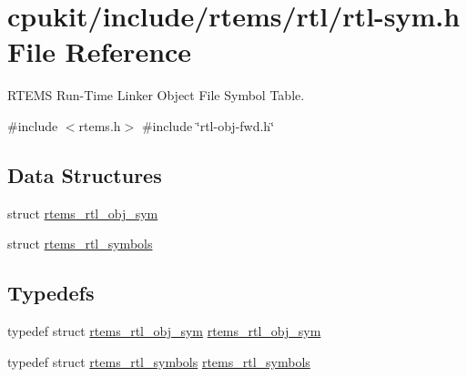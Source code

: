 \hypertarget{rtl-sym_8h}{}\section{cpukit/include/rtems/rtl/rtl-\/sym.h File Reference}
\label{rtl-sym_8h}


R\+T\+E\+MS Run-\/\+Time Linker Object File Symbol Table.  


{\ttfamily \#include $<$rtems.\+h$>$}\newline
{\ttfamily \#include \char`\"{}rtl-\/obj-\/fwd.\+h\char`\"{}}\newline
\subsection*{Data Structures}
\begin{DoxyCompactItemize}
\item 
struct \mbox{\hyperlink{structrtems__rtl__obj__sym}{rtems\+\_\+rtl\+\_\+obj\+\_\+sym}}
\item 
struct \mbox{\hyperlink{structrtems__rtl__symbols}{rtems\+\_\+rtl\+\_\+symbols}}
\end{DoxyCompactItemize}
\subsection*{Typedefs}
\begin{DoxyCompactItemize}
\item 
typedef struct \mbox{\hyperlink{structrtems__rtl__obj__sym}{rtems\+\_\+rtl\+\_\+obj\+\_\+sym}} \mbox{\hyperlink{rtl-sym_8h_af23a1068e1c54a0d60312697b21f2276}{rtems\+\_\+rtl\+\_\+obj\+\_\+sym}}
\item 
typedef struct \mbox{\hyperlink{structrtems__rtl__symbols}{rtems\+\_\+rtl\+\_\+symbols}} \mbox{\hyperlink{rtl-sym_8h_aa84d8fd3d69e40e02e072a09ec000569}{rtems\+\_\+rtl\+\_\+symbols}}
\end{DoxyCompactItemize}
